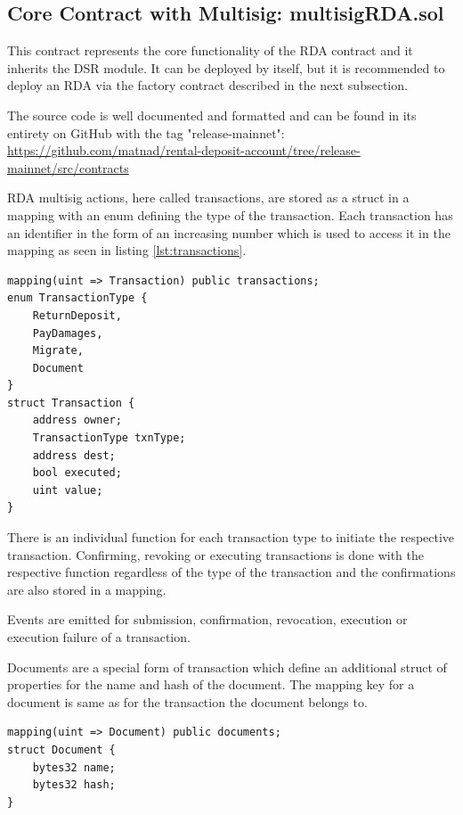 \documentclass[12pt,a4paper,titlepage,oneside,english]{article}
\begin{document}
\subsection{Core Contract with Multisig: multisigRDA.sol}

This contract represents the core functionality of the RDA contract and it inherits the DSR module. It can be deployed by itself, but it is recommended to deploy an RDA via the factory contract described in the next subsection.

The source code is well documented and formatted and can be found in its entirety on GitHub with the tag "release-mainnet": \\
\url{https://github.com/matnad/rental-deposit-account/tree/release-mainnet/src/contracts}


RDA multisig actions, here called transactions, are stored as a struct in a mapping with an enum defining the type of the transaction. Each transaction has an identifier in the form of an increasing number which is used to access it in the mapping as seen in listing \ref{lst:transactions}.

\begin{lstlisting}[caption=Transaction State, label=lst:transactions]
mapping(uint => Transaction) public transactions;
enum TransactionType {
	ReturnDeposit, 
	PayDamages, 
	Migrate, 
	Document
}
struct Transaction {
	address owner;
	TransactionType txnType;
	address dest;
	bool executed;
	uint value;
}
\end{lstlisting}

There is an individual function for each transaction type to initiate the respective transaction. Confirming, revoking or executing transactions is done with the respective function regardless of the type of the transaction and the confirmations are also stored in a mapping.

Events are emitted for submission, confirmation, revocation, execution or execution failure of a transaction.

Documents are a special form of transaction which define an additional struct of properties for the name and hash of the document. The mapping key for a document is same as for the transaction the document belongs to.

\begin{lstlisting}[caption=Document State, label=lst:documents]
mapping(uint => Document) public documents;
struct Document {
	bytes32 name;
	bytes32 hash;
}
\end{lstlisting}
\end{document}
